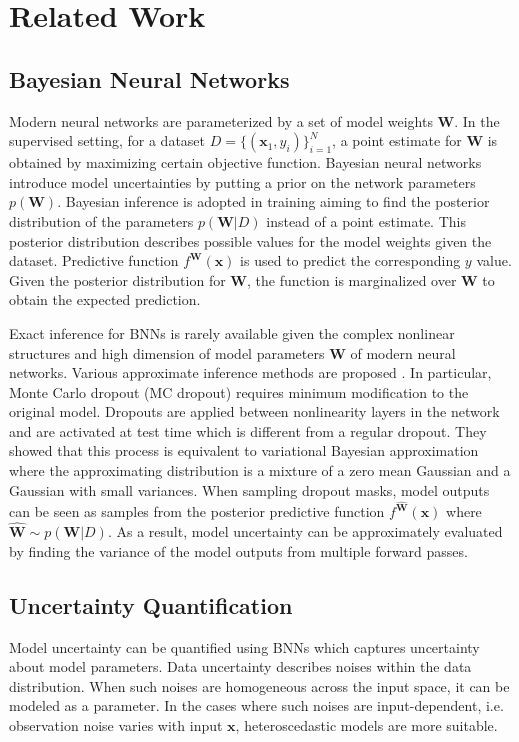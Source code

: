 \documentclass[letterpaper]{article} %
\newcommand{\vect}[1]{\mathbf{#1}}
\newcommand{\matr}[1]{\mathbf{#1}}
\newcommand{\vx}[0]{\vect{x}}
\newcommand{\mW}[0]{\matr{W}}
\begin{document}
\section{Related Work}

\subsection{Bayesian Neural Networks}
Modern neural networks are parameterized by a set of model weights $\mW$. In the supervised setting, for a dataset $D=\{(\vx_1,y_i)\}_{i=1}^N$, a point estimate for $\mW$ is obtained by maximizing certain objective function. Bayesian neural networks \cite{buntine1991bayesian,denker1991transforming,mackay1992practical,mackay1995probable,neal2012bayesian} introduce model uncertainties by putting a prior on the network parameters $p(\mW)$. Bayesian inference is adopted in training aiming to find the posterior distribution of the parameters $p(\mW|D)$ instead of a point estimate. This posterior distribution describes possible values for the model weights given the dataset. Predictive function $f^\mW(\vx)$ is used to predict the corresponding $y$ value. Given the posterior distribution for $\mW$, the function is marginalized over $\mW$ to obtain the expected prediction.

Exact inference for BNNs is rarely available given the complex nonlinear structures and high dimension of model parameters $\mW$ of modern neural networks. Various approximate inference methods are proposed \cite{graves2011practical,hernandez2015probabilistic,blundell2015weight,gal2016dropout}. In particular, Monte Carlo dropout (MC dropout) \cite{gal2016dropout} requires minimum modification to the original model. Dropouts are applied between nonlinearity layers in the network and are activated at test time which is different from a regular dropout. They showed that this process is equivalent to variational Bayesian approximation where the approximating distribution is a mixture of a zero mean Gaussian and a Gaussian with small variances. When sampling dropout masks, model outputs can be seen as samples from the posterior predictive function $f^{\widehat{\mW}}(\vx)$ where $\widehat{\mW}\sim p(\mW|D)$. As a result, model uncertainty can be approximately evaluated by finding the variance of the model outputs from multiple forward passes.

\subsection{Uncertainty Quantification}
Model uncertainty can be quantified using BNNs which captures uncertainty about model parameters. Data uncertainty describes noises within the data distribution. When such noises are homogeneous across the input space, it can be modeled as a parameter. In the cases where such noises are input-dependent, i.e. observation noise varies with input $\vx$, heteroscedastic models \cite{nix1994estimating,le2005heteroscedastic} are more suitable.
\end{document}

